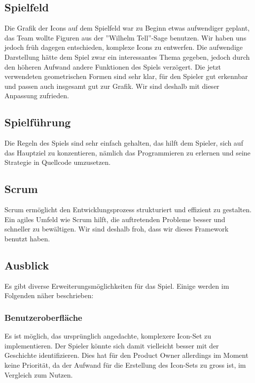 \documentclass[11pt,a4paper,titlepage]{article}
\begin{document}
\subsection{Spielfeld}

Die Grafik der Icons auf dem Spielfeld war zu Beginn etwas aufwendiger geplant, das Team wollte Figuren aus der ''Wilhelm Tell''-Sage benutzen. Wir haben uns jedoch früh dagegen entschieden, komplexe Icons zu entwerfen. Die aufwendige Darstellung hätte dem Spiel zwar ein interessantes Thema gegeben, jedoch durch den höheren Aufwand andere Funktionen des Spiels verzögert. Die jetzt verwendeten geometrischen Formen sind sehr klar, für den Spieler gut erkennbar und passen auch insgesamt gut zur Grafik. Wir sind deshalb mit dieser Anpassung zufrieden.

\subsection{Spielführung}

Die Regeln des Spiels sind sehr einfach gehalten, das hilft dem Spieler, sich auf das Hauptziel zu konzentieren, nämlich das Programmieren zu erlernen und seine Strategie in Quellcode umzusetzen.

\subsection{Scrum}
Scrum ermöglicht den Entwicklungsprozess strukturiert und effizient zu gestalten. Ein agiles Umfeld wie Scrum hilft, die auftretenden Probleme besser und schneller zu bewältigen. Wir sind deshalb froh, dass wir dieses Framework benutzt haben.

\subsection{Ausblick}

Es gibt diverse Erweiterungsmöglichkeiten für das Spiel. Einige werden im Folgenden näher beschrieben:

\subsubsection{Benutzeroberfläche}
Es ist möglich, das ursprünglich angedachte, komplexere Icon-Set zu implementieren. Der Spieler könnte sich damit vielleicht besser mit der Geschichte identifizieren. Dies hat für den Product Owner allerdings im Moment keine Priorität, da der Aufwand für die Erstellung des Icon-Sets zu gross ist, im Vergleich zum Nutzen.
\end{document}
